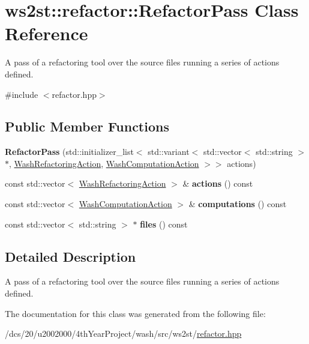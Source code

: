 \hypertarget{classws2st_1_1refactor_1_1RefactorPass}{}\section{ws2st\+:\+:refactor\+:\+:Refactor\+Pass Class Reference}
\label{classws2st_1_1refactor_1_1RefactorPass}


A pass of a refactoring tool over the source files running a series of actions defined.  




{\ttfamily \#include $<$refactor.\+hpp$>$}

\subsection*{Public Member Functions}
\begin{DoxyCompactItemize}
\item 
\mbox{\label{classws2st_1_1refactor_1_1RefactorPass_a2e7cff9227709e40ebda3cb4acfc8fb4}} 
{\bfseries Refactor\+Pass} (std\+::initializer\+\_\+list$<$ std\+::variant$<$ std\+::vector$<$ std\+::string $>$ $\ast$, \mbox{\hyperlink{classws2st_1_1refactor_1_1WashRefactoringAction}{Wash\+Refactoring\+Action}}, \mbox{\hyperlink{classws2st_1_1refactor_1_1WashComputationAction}{Wash\+Computation\+Action}} $>$$>$ actions)
\item 
\mbox{\label{classws2st_1_1refactor_1_1RefactorPass_a349d409f7570c2516f690b8fe17ad20f}} 
const std\+::vector$<$ \mbox{\hyperlink{classws2st_1_1refactor_1_1WashRefactoringAction}{Wash\+Refactoring\+Action}} $>$ \& {\bfseries actions} () const
\item 
\mbox{\label{classws2st_1_1refactor_1_1RefactorPass_aa92ed5b7adb785f3cfb42f41b1a003e4}} 
const std\+::vector$<$ \mbox{\hyperlink{classws2st_1_1refactor_1_1WashComputationAction}{Wash\+Computation\+Action}} $>$ \& {\bfseries computations} () const
\item 
\mbox{\label{classws2st_1_1refactor_1_1RefactorPass_ac1c2e95b13d25ee91b5aa9c065296884}} 
const std\+::vector$<$ std\+::string $>$ $\ast$ {\bfseries files} () const
\end{DoxyCompactItemize}


\subsection{Detailed Description}
A pass of a refactoring tool over the source files running a series of actions defined. 

The documentation for this class was generated from the following file\+:\begin{DoxyCompactItemize}
\item 
/dcs/20/u2002000/4th\+Year\+Project/wash/src/ws2st/\mbox{\hyperlink{refactor_8hpp}{refactor.\+hpp}}\end{DoxyCompactItemize}
